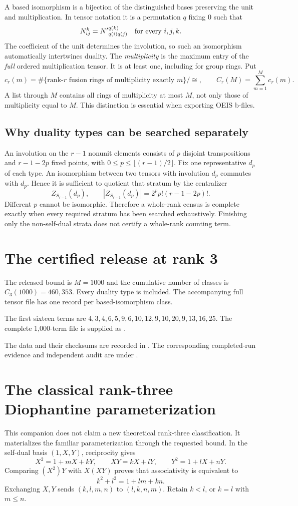 \documentclass[11pt,a4paper]{article}
\theoremstyle{definition}\newtheorem{definition}[theorem]{Definition}\newtheorem{remark}[theorem]{Remark}
\begin{document}
A based isomorphism is a bijection of the distinguished bases preserving the
unit and multiplication. In tensor notation it is a permutation $q$ fixing $0$
such that
\[
 N_{ij}^{k}={N'}_{q(i)q(j)}^{q(k)}\quad\hbox{for every }i,j,k.
\]
The coefficient of the unit determines the involution, so such an isomorphism
automatically intertwines duality. The \emph{multiplicity} is the maximum entry
of the \emph{full} ordered multiplication tensor. It is at least one, including
for group rings. Put
\[
 c_r(m)=\#\{\text{rank-}r\text{ fusion rings of multiplicity exactly }m\}/\cong,
 \qquad C_r(M)=\sum_{m=1}^{M}c_r(m).
\]
A list through $M$ contains all rings of multiplicity at most $M$, not only
those of multiplicity equal to $M$. This distinction is essential when exporting
OEIS b-files.

\subsection{Why duality types can be searched separately}
An involution on the $r-1$ nonunit elements consists of $p$ disjoint transpositions
and $r-1-2p$ fixed points, with $0\leq p\leq\lfloor(r-1)/2\rfloor$. Fix one
representative $d_p$ of each type. An isomorphism between two tensors with
involution $d_p$ commutes with $d_p$. Hence it is sufficient to quotient that
stratum by the centralizer
\[
 Z_{S_{r-1}}(d_p),\qquad |Z_{S_{r-1}}(d_p)|=2^p p!(r-1-2p)!.
\]
Different $p$ cannot be isomorphic. Therefore a whole-rank census is complete
exactly when every required stratum has been searched exhaustively. Finishing
only the non-self-dual strata does not certify a whole-rank counting term.
\section{The certified release at rank 3}
The released bound is $M=1000$ and the cumulative number of classes is $C_{3}(1000)=460,353$. Every duality type is included. The accompanying full tensor file has one record per based-isomorphism class.

The first sixteen terms are $4,3,4,6,5,9,6,10,12,9,10,20,9,13,16,25$. The complete 1,000-term file is supplied as .

The data and their checksums are recorded in . The corresponding completed-run evidence and independent audit are under .

\section{The classical rank-three Diophantine parameterization}
This companion does not claim a new theoretical rank-three classification.
It materializes the familiar parameterization through the requested bound.
In the self-dual basis $(1,X,Y)$, reciprocity gives
\[
X^2=1+mX+kY,\qquad XY=kX+lY,\qquad Y^2=1+lX+nY.
\]
Comparing $(X^2)Y$ with $X(XY)$ proves that associativity is equivalent to
\begin{equation}k^2+l^2=1+lm+kn.\label{eq:rankthree}\end{equation}
Exchanging $X,Y$ sends $(k,l,m,n)$ to $(l,k,n,m)$. Retain $k<l$, or $k=l$
with $m\leq n$.
\end{document}
